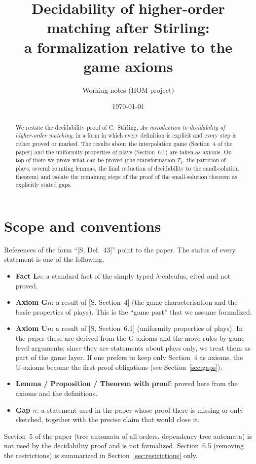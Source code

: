 \documentclass[11pt]{article}
\title{Decidability of higher-order matching after Stirling:\\
a formalization relative to the game axioms}
\author{Working notes (HOM project)}
\date{\today}
\theoremstyle{plain}
\theoremstyle{definition}
\theoremstyle{remark}
\begin{document}
\maketitle

\begin{abstract}
We restate the decidability proof of C.~Stirling, \emph{An introduction
to decidability of higher-order matching}, in a form in which every
definition is explicit and every step is either proved or marked.  The
results about the interpolation game (Section~4 of the paper) and the
uniformity properties of plays (Section~6.1) are taken as axioms.  On
top of them we prove what can be proved (the transformation $T_1$, the
partition of plays, several counting lemmas, the final reduction of
decidability to the small-solution theorem) and isolate the remaining
steps of the proof of the small-solution theorem as explicitly stated
gaps.
\end{abstract}

\tableofcontents

\section{Scope and conventions}

References of the form ``[S, Def.~43]'' point to the paper.  The status
of every statement is one of the following.
\begin{itemize}
\item \textbf{Fact L$n$}: a standard fact of the simply typed
  $\lambda$-calculus, cited and not proved.
\item \textbf{Axiom G$n$}: a result of [S, Section~4] (the game
  characterisation and the basic properties of plays).  This is the
  ``game part'' that we assume formalized.
\item \textbf{Axiom U$n$}: a result of [S, Section~6.1] (uniformity
  properties of plays).  In the paper these are derived from the
  G-axioms and the move rules by game-level arguments; since they are
  statements about plays only, we treat them as part of the game layer.
  If one prefers to keep only Section~4 as axioms, the U-axioms become
  the first proof obligations (see Section~\ref{sec:gaps}).
\item \textbf{Lemma / Proposition / Theorem with proof}: proved here
  from the axioms and the definitions.
\item \textbf{Gap $n$}: a statement used in the paper whose proof there
  is missing or only sketched, together with the precise claim that
  would close it.
\end{itemize}
Section~5 of the paper (tree automata of all orders, dependency tree
automata) is not used by the decidability proof and is not formalized.
Section~6.5 (removing the restrictions) is summarized in
Section~\ref{sec:restrictions} only.
\end{document}
